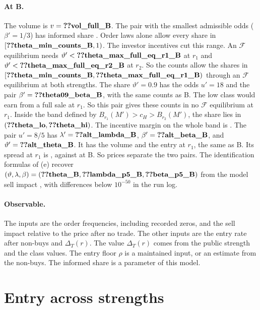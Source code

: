 \documentclass[12pt]{article}
\theoremstyle{definition}
\newcommand{\cH}{c_H}
\begin{document}
\paragraph{At B.}
The volume is $v=\reg{vol_full_B}$.
The pair with the smallest admissible odds ($\beta'=1/3$) has informed share .
Order laws alone allow every share in $[\reg{theta_min_counts_B},1)$.
The investor incentives cut this range.
An $\mathcal F$ equilibrium needs $\vartheta'<\reg{theta_max_full_eq_r1_B}$ at $r_1$ and $\vartheta'<\reg{theta_max_full_eq_r2_B}$ at $r_2$.
So the counts allow the shares in $[\reg{theta_min_counts_B},\reg{theta_max_full_eq_r1_B})$ through an $\mathcal F$ equilibrium at both strengths.
The share $\vartheta'=0.9$ has the odds $u'=18$ and the pair $\beta'=\reg{theta09_beta_B}$, with the same counts as B.
The low class would earn  from a full sale at $r_1$.
So this pair gives these counts in no $\mathcal F$ equilibrium at $r_1$.
Inside the band defined by $B_{r_1}(M')>\cH>B_{r_2}(M')$, the share lies in $(\reg{theta_lo},\reg{theta_hi})$.
The incentive margin on the whole band is .
The pair $u'=8/5$ has $\lambda'=\reg{alt_lambda_B}$, $\beta'=\reg{alt_beta_B}$, and $\vartheta'=\reg{alt_theta_B}$.
It has the volume  and the entry  at $r_1$, the same as B.
Its spread at $r_1$ is , against  at B.
So prices separate the two pairs.
The identification formulas of (e) recover $(\vartheta,\lambda,\beta)=(\reg{theta_B},\reg{lambda_p5_B},\reg{beta_p5_B})$ from the model sell impact , with differences below $10^{-50}$ in the run log.

\paragraph{Observable.}
The inputs are the order frequencies, including recorded zeros, and the sell impact relative to the price after no trade.
The other inputs are the entry rate after non-buys and $\Delta_T(r)$.
The value $\Delta_T(r)$ comes from the public strength and the class values.
The entry floor $\rho$ is a maintained input, or an estimate from the non-buys.
The informed share is a parameter of this model.

\section{Entry across strengths}\label{sec:entry}
\end{document}
